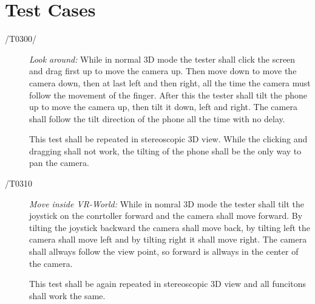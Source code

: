 \section{Test Cases}





\begin{description}
  \item[/T0300/]
    \textit{Look around:} While in normal 3D mode the tester shall click the screen and drag first up to move the camera up.
    Then move down to move the camera down, then at last left and then right, all the time the camera must follow the movement of the finger.
    After this the tester shall tilt the phone up to move the camera up, then tilt it down, left and right. The camera shall follow the tilt direction of the phone all the time with no delay.

    This test shall be repeated in stereoscopic 3D view. While the clicking and dragging shall not work, the tilting of the phone shall be the only way to pan the camera.
\end{description}

\begin{description}
  \item[/T0310]
    \textit{Move inside VR-World:} While in nomral 3D mode the tester shall tilt the joystick on the conrtoller forward and the camera shall move forward.
    By tilting the joystick backward the camera shall move back, by tilting left the camera shall move left and by tilting right it shall move right.
    The camera shall allways follow the view point, so forward is allways in the center of the camera.

    This test shall be again repeated in stereoscopic 3D view and all funcitons shall work the same.
\end{description}
